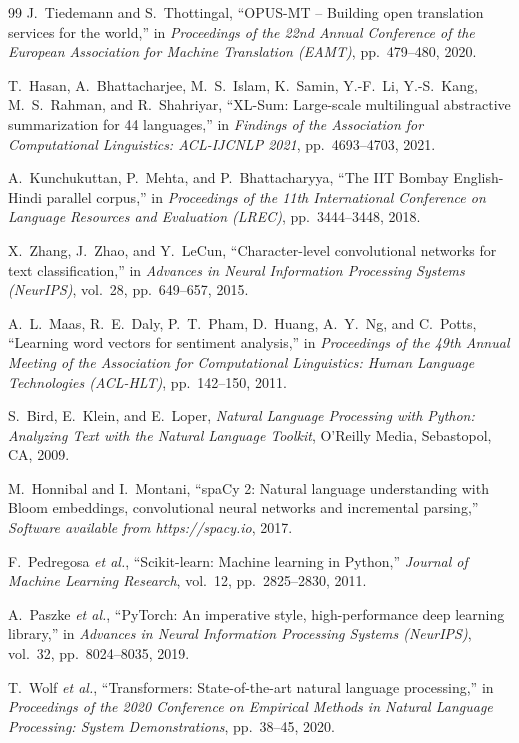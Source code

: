 \begin{thebibliography}{99}
J.~Tiedemann and S.~Thottingal,
``OPUS-MT -- Building open translation services for the world,''
in \emph{Proceedings of the 22nd Annual Conference of the European Association for Machine Translation (EAMT)}, pp.~479--480, 2020.

T.~Hasan, A.~Bhattacharjee, M.~S.~Islam, K.~Samin, Y.-F.~Li, Y.-S.~Kang, M.~S.~Rahman, and R.~Shahriyar,
``XL-Sum: Large-scale multilingual abstractive summarization for 44 languages,''
in \emph{Findings of the Association for Computational Linguistics: ACL-IJCNLP 2021}, pp.~4693--4703, 2021.

A.~Kunchukuttan, P.~Mehta, and P.~Bhattacharyya,
``The IIT Bombay English-Hindi parallel corpus,''
in \emph{Proceedings of the 11th International Conference on Language Resources and Evaluation (LREC)}, pp.~3444--3448, 2018.

X.~Zhang, J.~Zhao, and Y.~LeCun,
``Character-level convolutional networks for text classification,''
in \emph{Advances in Neural Information Processing Systems (NeurIPS)}, vol.~28, pp.~649--657, 2015.

A.~L.~Maas, R.~E.~Daly, P.~T.~Pham, D.~Huang, A.~Y.~Ng, and C.~Potts,
``Learning word vectors for sentiment analysis,''
in \emph{Proceedings of the 49th Annual Meeting of the Association for Computational Linguistics: Human Language Technologies (ACL-HLT)}, pp.~142--150, 2011.

S.~Bird, E.~Klein, and E.~Loper,
\emph{Natural Language Processing with Python: Analyzing Text with the Natural Language Toolkit},
O'Reilly Media, Sebastopol, CA, 2009.

M.~Honnibal and I.~Montani,
``spaCy 2: Natural language understanding with Bloom embeddings, convolutional neural networks and incremental parsing,''
\emph{Software available from https://spacy.io}, 2017.

F.~Pedregosa \emph{et al.},
``Scikit-learn: Machine learning in Python,''
\emph{Journal of Machine Learning Research}, vol.~12, pp.~2825--2830, 2011.

A.~Paszke \emph{et al.},
``PyTorch: An imperative style, high-performance deep learning library,''
in \emph{Advances in Neural Information Processing Systems (NeurIPS)}, vol.~32, pp.~8024--8035, 2019.

T.~Wolf \emph{et al.},
``Transformers: State-of-the-art natural language processing,''
in \emph{Proceedings of the 2020 Conference on Empirical Methods in Natural Language Processing: System Demonstrations}, pp.~38--45, 2020.


\end{thebibliography}
